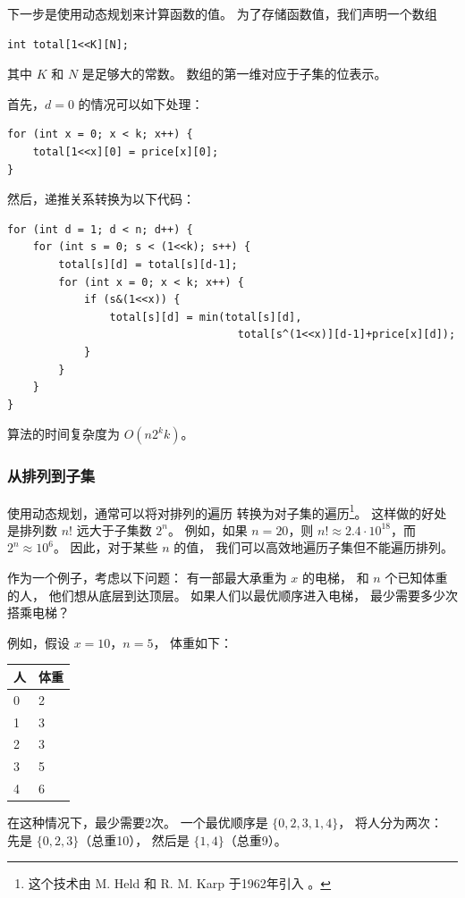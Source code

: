下一步是使用动态规划来计算函数的值。
为了存储函数值，我们声明一个数组
\begin{lstlisting}
int total[1<<K][N];
\end{lstlisting}
其中 $K$ 和 $N$ 是足够大的常数。
数组的第一维对应于子集的位表示。

首先，$d=0$ 的情况可以如下处理：
\begin{lstlisting}
for (int x = 0; x < k; x++) {
    total[1<<x][0] = price[x][0];
}
\end{lstlisting}
然后，递推关系转换为以下代码：
\begin{lstlisting}
for (int d = 1; d < n; d++) {
    for (int s = 0; s < (1<<k); s++) {
        total[s][d] = total[s][d-1];
        for (int x = 0; x < k; x++) {
            if (s&(1<<x)) {
                total[s][d] = min(total[s][d],
                                    total[s^(1<<x)][d-1]+price[x][d]);
            }
        }
    }
}
\end{lstlisting}
算法的时间复杂度为 $O(n 2^k k)$。

\subsubsection{从排列到子集}

使用动态规划，通常可以将对排列的遍历
转换为对子集的遍历\footnote{这个技术由 M. Held 和 R. M. Karp 于1962年引入 \cite{hel62}。}。
这样做的好处是排列数 $n!$
远大于子集数 $2^n$。
例如，如果 $n=20$，则
$n! \approx 2.4 \cdot 10^{18}$，而 $2^n \approx 10^6$。
因此，对于某些 $n$ 的值，
我们可以高效地遍历子集但不能遍历排列。

作为一个例子，考虑以下问题：
有一部最大承重为 $x$ 的电梯，
和 $n$ 个已知体重的人，
他们想从底层到达顶层。
如果人们以最优顺序进入电梯，
最少需要多少次搭乘电梯？

例如，假设 $x=10$，$n=5$，
体重如下：
\begin{center}
\begin{tabular}{ll}
人 & 体重 \\
\hline
0 & 2 \\
1 & 3 \\
2 & 3 \\
3 & 5 \\
4 & 6 \\
\end{tabular}
\end{center}
在这种情况下，最少需要2次。
一个最优顺序是 $\{0,2,3,1,4\}$，
将人分为两次：
先是 $\{0,2,3\}$（总重10），
然后是 $\{1,4\}$（总重9）。

